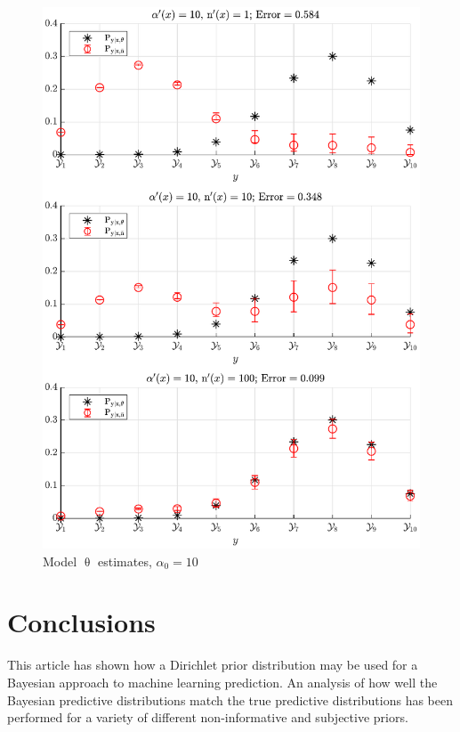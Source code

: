 \documentclass[conference]{IEEEtran}
\begin{document}
\begin{figure}
\centering
\includegraphics[width=1\linewidth]{P_yx_error_a0_10.pdf}
\caption{Model $\uptheta$ estimates, $\alpha_0 = 10$}
\label{fig:P_yx_error_a0_10}
\end{figure}





\section{Conclusions}

This article has shown how a Dirichlet prior distribution may be used for a Bayesian approach to machine learning prediction. An analysis of how well the Bayesian predictive distributions match the true predictive distributions has been performed for a variety of different non-informative and subjective priors.
\end{document}
